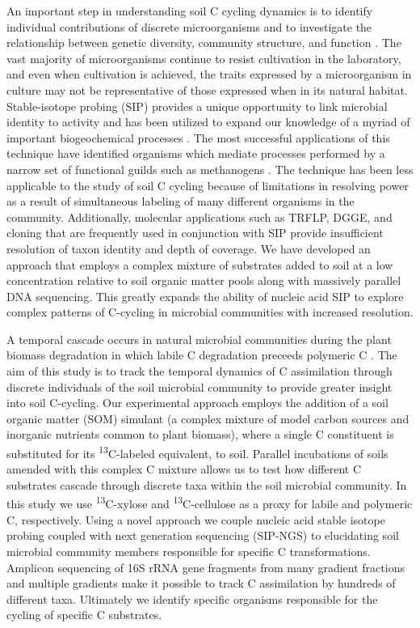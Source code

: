 An important step in understanding soil C cycling dynamics is to identify individual contributions of discrete microorganisms and to investigate the relationship between genetic diversity, community structure, and function \cite{O_Donnell_2002}. The vast majority of microorganisms continue to resist cultivation in the laboratory, and even when cultivation is achieved, the traits expressed by a microorganism in culture may not be representative of those expressed when in its natural habitat. Stable-isotope probing (SIP) provides a unique opportunity to link microbial identity to activity and has been utilized to expand our knowledge of a myriad of important biogeochemical processes \cite{Chen_Murrell_2010}. The most successful applications of this technique have identified organisms which mediate processes performed by a narrow set of functional guilds such as methanogens \cite{Lu_2005}. The technique has been less applicable to the study of soil C cycling because of limitations in resolving power as a result of simultaneous labeling of many different organisms in the community. Additionally, molecular applications such as TRFLP, DGGE, and cloning that are frequently used in conjunction with SIP provide insufficient resolution of taxon identity and depth of coverage. We have developed an approach that employs a complex mixture of substrates added to soil at a low concentration relative to soil organic matter pools along with massively parallel DNA sequencing. This greatly expands the ability of nucleic acid SIP to explore complex patterns of C-cycling in microbial communities with increased resolution. 

A temporal cascade occurs in natural microbial communities during the plant biomass degradation in which labile C degradation preceeds polymeric C \cite{Hu_1997,Rui_2009}. The aim of this study is to track the temporal dynamics of C assimilation through discrete individuals of the soil microbial community to provide greater insight into soil C-cycling. Our experimental approach employs the addition of a soil organic matter (SOM) simulant (a complex mixture of model carbon sources and inorganic nutrients common to plant biomass), where a single C constituent is substituted for its \textsuperscript{13}C-labeled equivalent, to soil. Parallel incubations of soils amended with this complex C mixture allows us to test how different C substrates cascade through discrete taxa within the soil microbial community. In this study we use \textsuperscript{13}C-xylose and \textsuperscript{13}C-cellulose as a proxy for labile and polymeric C, respectively. Using a novel approach we couple nucleic acid stable isotope probing coupled with next generation sequencing (SIP-NGS) to elucidating soil microbial community members responsible for specific C transformations. Amplicon sequencing of 16S rRNA gene fragments from many gradient fractions and multiple gradients make it possible to track C assimilation by hundreds of different taxa. Ultimately we identify specific organisms responsible for the cycling of specific C substrates. 

